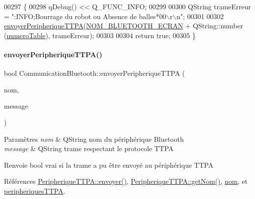 \begin{DoxyCode}
00297 \{
00298     qDebug() << Q\_FUNC\_INFO;
00299 
00300     QString trameErreur = \textcolor{stringliteral}{":INFO;Bourrage du robot ou Absence de balles*00\(\backslash\)r\(\backslash\)n"};
00301 
00302     \hyperlink{class_communication_bluetooth_a73d95b841bf64a4463760435a41fc219}{envoyerPeripheriqueTTPA}(\hyperlink{terminal-_t_t_p_a_2communicationbluetooth_8h_a2bd8beaaf0c4b59979a3f78d4c134ec8}{NOM\_BLUETOOTH\_ECRAN} + QString::number
      (\hyperlink{class_communication_bluetooth_a9428f8261f0cc055e9c6fed9a61cb595}{numeroTable}), trameErreur);
00303 
00304     \textcolor{keywordflow}{return} \textcolor{keyword}{true};
00305 \}
\end{DoxyCode}
\mbox{\label{class_communication_bluetooth_a73d95b841bf64a4463760435a41fc219}} 
\paragraph{\texorpdfstring{envoyer\+Peripherique\+T\+T\+P\+A()}{envoyerPeripheriqueTTPA()}}
{\footnotesize\ttfamily bool Communication\+Bluetooth\+::envoyer\+Peripherique\+T\+T\+PA (\begin{DoxyParamCaption}\item[{Q\+String}]{nom,  }\item[{Q\+String}]{message }\end{DoxyParamCaption})}


\begin{DoxyParams}{Paramètres}
{\em nom} & Q\+String nom du périphérique Bluetooth \\
\hline
{\em message} & Q\+String trame respectant le protocole T\+T\+PA \\
\hline
\end{DoxyParams}
\begin{DoxyReturn}{Renvoie}
bool vrai si la trame a pu être envoyé au périphérique T\+T\+PA 
\end{DoxyReturn}


Références \hyperlink{class_peripherique_t_t_p_a_a529048ac8be73560038bbeee0047b634}{Peripherique\+T\+T\+P\+A\+::envoyer()}, \hyperlink{class_peripherique_t_t_p_a_abb04680791a7e778ac3808b5d218421f}{Peripherique\+T\+T\+P\+A\+::get\+Nom()}, \hyperlink{class_communication_bluetooth_a320cc60a0cb6b4ea9e009fef2853f1d2}{nom}, et \hyperlink{class_communication_bluetooth_a656a80f8216d2a4db7cf2f865365e562}{peripheriques\+T\+T\+PA}.




